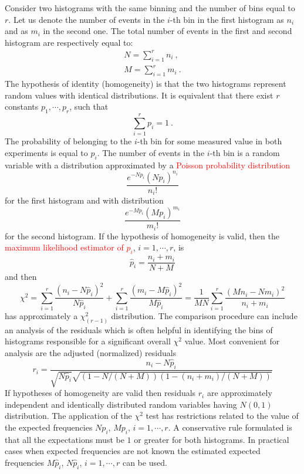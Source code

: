 \documentclass[12pt,a4paper]{article}
\begin{document}
Consider two histograms with the same binning and the number of bins equal to $r$. Let us denote the number of events in the $i$-th bin in the first histogram as $n_i$ and as $m_i$ in the second one. The total number of events in the first and second histogram are respectively equal to:
\begin{eqnarray*}
N = \sum_{i=1}^r n_i ~,\\
M = \sum_{i=1}^r m_i ~.
\end{eqnarray*}
The hypothesis of identity (homogeneity) is that the two histograms represent random values with identical distributions. It is equivalent that there exist $r$ constants $p_1, \cdots, p_r$, such that
\begin{equation}
\sum_{i=1}^r p_i = 1 ~.
\end{equation}
The probability of belonging to the $i$-th bin for some measured value in both experiments is equal to $p_i$. The number of events in the $i$-th bin is a random variable with a distribution approximated by a \textcolor{red}{Poisson probability distribution}
\begin{equation}
\frac{e^{-Np_i} (Np_i)^{n_i} }{n_i!}
\end{equation}
for the first histogram and with distribution
\begin{equation}
\frac{e^{-Mp_i} (Mp_i)^{m_i} }{m_i!}
\end{equation}
for the second histogram. If the hypothesis of homogeneity is valid, then the \textcolor{red}{maximum likelihood estimator of $p_i$}, $i=1, \cdots, r$, is
\begin{equation}
\hat{p}_i = \frac{n_i+m_i}{N+M}
\end{equation}
and then
\begin{equation}
\chi^2 = \sum_{i=1}^r \frac{(n_i -N\hat{p}_i)^2}{N\hat{p}_i} +\sum_{i=1}^r \frac{(m_i -M\hat{p}_i)^2}{M\hat{p}_i} = \frac{1}{MN} \sum_{i=1}^r \frac{(Mn_i-Nm_i)^2}{n_i+m_i}
\end{equation}
has approximately a $\chi^2_{(r−1)}$ distribution. The comparison procedure can include an analysis of the residuals which is often helpful in identifying the bins of histograms responsible for a significant overall $\chi^2$ value. Most convenient for analysis are the adjusted (normalized) residuals 
\begin{equation}
r_i = \frac{n_i -N\hat{p}_i}{\sqrt{N\hat{p}_i} \sqrt{(1-N/(N+M))(1-(n_i+m_i)/(N+M))} }
\end{equation}
If hypotheses of homogeneity are valid then residuals $r_i$ are approximately independent and identically distributed random variables having $N(0,1)$ distribution. The application of the $\chi^2$ test has restrictions related to the value of the expected frequencies $Np_i$, $Mp_i$, $i=1,\cdots,r$. A conservative rule formulated is that all the expectations must be $1$ or greater for both histograms. In practical cases when expected frequencies are not known the estimated expected frequencies $M\hat{p}_i$, $N\hat{p}_i$, $i=1, \cdots,r$ can be used.
\end{document}
